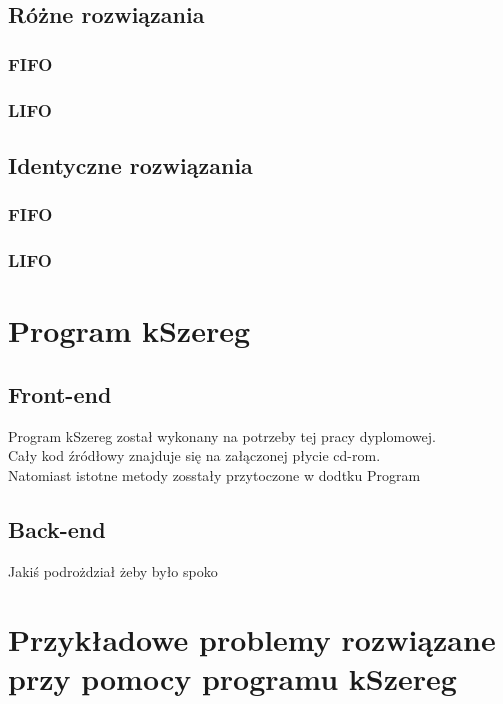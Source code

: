 \documentclass[twoside]{pracaInzynierskaMS}
\begin{document}
\subsection     {Różne rozwiązania}
\subsubsection  {FIFO}

\subsubsection  {LIFO}

\subsection     {Identyczne rozwiązania}
\subsubsection  {FIFO}

\subsubsection  {LIFO}

       
\section        {Program kSzereg}
\subsection     {Front-end}
Program kSzereg został wykonany na potrzeby tej pracy dyplomowej.\\
Cały kod źródłowy znajduje się na załączonej płycie cd-rom. \\
Natomiast istotne metody  zosstały przytoczone w dodtku Program

\subsection     {Back-end}
Jakiś podrożdział żeby było spoko
       
\section        [Przykładowe problemy \ldots]
                {Przykładowe problemy rozwiązane przy pomocy programu kSzereg}
       
\end{document}
